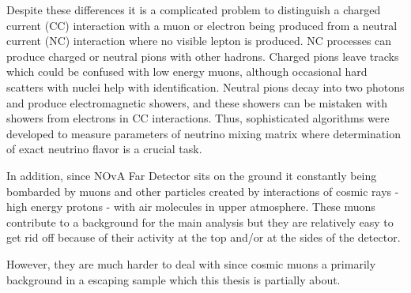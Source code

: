 Despite these differences it is a complicated problem to distinguish a charged current (CC) interaction with
a muon or electron being produced from a neutral current (NC) interaction where no visible lepton is produced.
NC processes can produce charged or neutral pions with other hadrons. Charged pions
leave tracks which could be confused with low energy muons, although occasional hard scatters with 
nuclei help with identification. Neutral pions decay into two photons and produce electromagnetic
showers, and these showers can be mistaken with showers from electrons in CC interactions.
Thus, sophisticated algorithms were developed to measure parameters of neutrino mixing matrix where 
determination of exact neutrino flavor is a crucial task.

In addition, since NOvA Far Detector sits on the ground it constantly being bombarded by muons and other
particles created by interactions of cosmic rays - high energy protons - with air molecules in upper atmosphere. 
These muons contribute to a background for the main analysis but they are relatively easy to get rid off
because of their activity at the top and/or at the sides of the detector. 

However, they are much harder to deal with since cosmic muons a primarily background in a escaping sample 
which this thesis is partially about.

